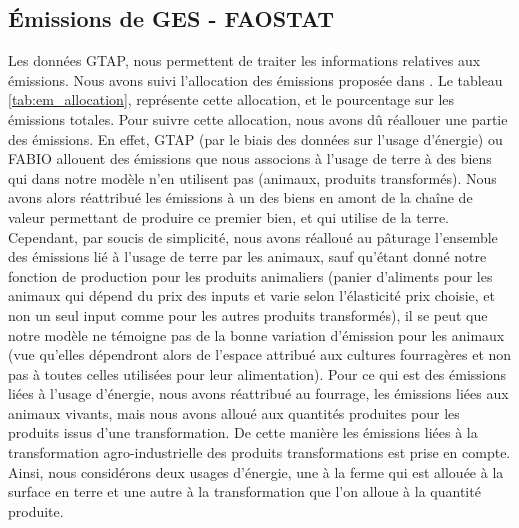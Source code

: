 \subsection{Émissions de GES - FAOSTAT}

Les données GTAP, nous permettent de traiter les informations relatives aux émissions. Nous avons suivi l'allocation des émissions proposée dans \cite{Valin2023}. Le tableau \ref{tab:em_allocation}, représente cette allocation, et le pourcentage sur les émissions totales. Pour suivre cette allocation, nous avons dû réallouer une partie des émissions. En effet, GTAP (par le biais des données sur l'usage d'énergie) ou FABIO allouent des émissions que nous associons à l'usage de terre à des biens qui dans notre modèle n'en utilisent pas (animaux, produits transformés). Nous avons alors réattribué les émissions à un des biens en amont de la chaîne de valeur permettant de produire ce premier bien, et qui utilise de la terre. Cependant, par soucis de simplicité, nous avons réalloué au pâturage l'ensemble des émissions lié à l'usage de terre par les animaux, sauf qu'étant donné notre fonction de production pour les produits animaliers (panier d'aliments pour les animaux qui dépend du prix des inputs et varie selon l'élasticité prix choisie, et non un seul input comme pour les autres produits transformés), il se peut que notre modèle ne témoigne pas de la bonne variation d'émission pour les animaux (vue qu'elles dépendront alors de l'espace attribué aux cultures fourragères et non pas à toutes celles utilisées pour leur alimentation). Pour ce qui est des émissions liées à l'usage d'énergie, nous avons réattribué au fourrage, les émissions liées aux animaux vivants, mais nous avons alloué aux quantités produites pour les produits issus d'une transformation. De cette manière les émissions liées à la transformation agro-industrielle des produits transformations est prise en compte. Ainsi, nous considérons deux usages d'énergie, une à la ferme qui est allouée à la surface en terre et une autre à la transformation que l'on alloue à la quantité produite.

